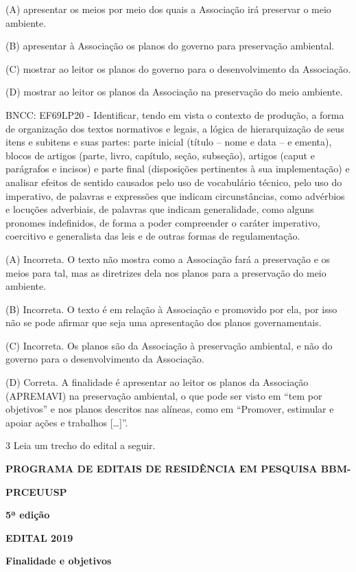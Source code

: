 \begin{itemize}
(A) apresentar os meios por meio dos quais a Associação irá preservar o
meio ambiente.

(B) apresentar à Associação os planos do governo para preservação
ambiental.

(C) mostrar ao leitor os planos do governo para o desenvolvimento da
Associação.

(D) mostrar ao leitor os planos da Associação na preservação do meio
ambiente.

BNCC: EF69LP20 - Identificar, tendo em vista o contexto de produção, a
forma de organização dos textos normativos e legais, a lógica de
hierarquização de seus itens e subitens e suas partes: parte inicial
(título -- nome e data -- e ementa), blocos de artigos (parte, livro,
capítulo, seção, subseção), artigos (caput e parágrafos e incisos) e
parte final (disposições pertinentes à sua implementação) e analisar
efeitos de sentido causados pelo uso de vocabulário técnico, pelo uso do
imperativo, de palavras e expressões que indicam circunstâncias, como
advérbios e locuções adverbiais, de palavras que indicam generalidade,
como alguns pronomes indefinidos, de forma a poder compreender o caráter
imperativo, coercitivo e generalista das leis e de outras formas de
regulamentação.

(A) Incorreta. O texto não mostra como a Associação fará a preservação e
os meios para tal, mas as diretrizes dela nos planos para a preservação
do meio ambiente.

(B) Incorreta. O texto é em relação à Associação e promovido por ela,
por isso não se pode afirmar que seja uma apresentação dos planos
governamentais.

(C) Incorreta. Os planos são da Associação à preservação ambiental, e
não do governo para o desenvolvimento da Associação.

(D) Correta. A finalidade é apresentar ao leitor os planos da Associação
(APREMAVI) na preservação ambiental, o que pode ser visto em ``tem por
objetivos'' e nos planos descritos nas alíneas, como em ``Promover,
estimular e apoiar ações e trabalhos {[}\ldots{}{]}''.

\num{3} Leia um trecho do edital a seguir.

\textbf{PROGRAMA DE EDITAIS DE RESIDÊNCIA EM PESQUISA BBM-}

\textbf{PRCEUUSP}

\textbf{5ª edição}

\textbf{EDITAL 2019}

\textbf{Finalidade e objetivos}


\end{itemize}
